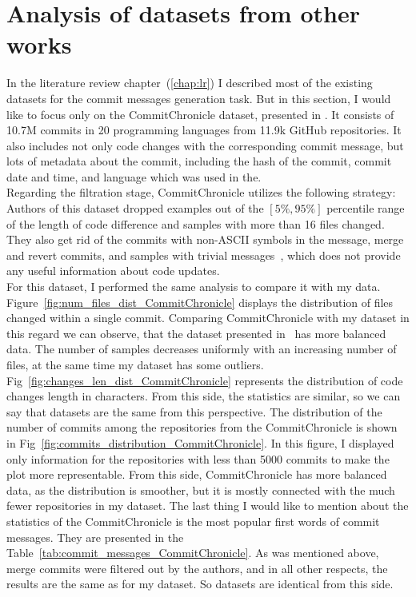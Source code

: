 \section{Analysis of datasets from other works}
In the literature review chapter~(\ref{chap:lr}) I described most of the existing datasets for the commit messages generation task. But in this section, I would like to focus only on the CommitChronicle dataset, presented in {}\cite{eliseeva2023commit}. It consists of 10.7M commits in 20 programming languages from 11.9k GitHub repositories. It also includes not only code changes with the corresponding commit message, but lots of metadata about the commit, including the hash of the commit, commit date and time, and language which was used in the. \\
Regarding the filtration stage, CommitChronicle utilizes the following strategy: Authors of this dataset dropped examples out of the $[5\%, 95\%]$ percentile range of the length of code difference and samples with more than 16 files changed. They also get rid of the commits with non-ASCII symbols in the message, merge and revert commits, and samples with trivial messages~\cite{liu2018neural}, which does not provide any useful information about code updates. \\
For this dataset, I performed the same analysis to compare it with my data. Figure~{}\ref{fig:num_files_dist_CommitChronicle} displays the distribution of files changed within a single commit. Comparing CommitChronicle with my dataset in this regard we can observe, that the dataset presented in~\cite{eliseeva2023commit} has more balanced data. The number of samples decreases uniformly with an increasing number of files, at the same time my dataset has some outliers. Fig~{}\ref{fig:changes_len_dist_CommitChronicle} represents the distribution of code changes length in characters. From this side, the statistics are similar, so we can say that datasets are the same from this perspective. The distribution of the number of commits among the repositories from the CommitChronicle is shown in Fig~{}\ref{fig:commits_distribution_CommitChronicle}. In this figure, I displayed only information for the repositories with less than 5000 commits to make the plot more representable. From this side, CommitChronicle has more balanced data, as the distribution is smoother, but it is mostly connected with the much fewer repositories in my dataset. The last thing I would like to mention about the statistics of the CommitChronicle is the most popular first words of commit messages. They are presented in the Table~{}\ref{tab:commit_messages_CommitChronicle}. As was mentioned above, merge commits were filtered out by the authors, and in all other respects, the results are the same as for my dataset. So datasets are identical from this side.

